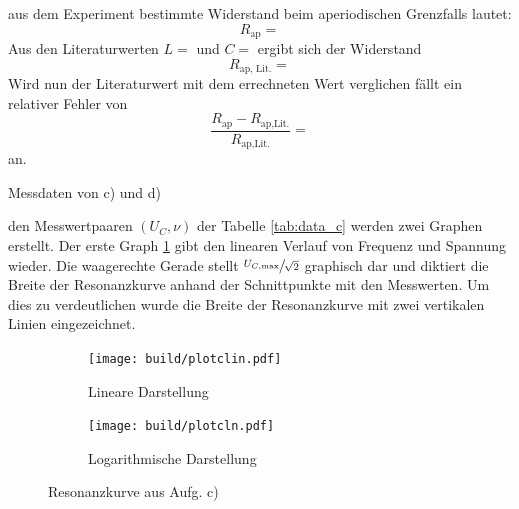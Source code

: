 
  \justifying aus dem Experiment bestimmte Widerstand beim aperiodischen Grenzfalls lautet:
  \begin{equation}
  R_{\text{ap}} = \text{} \label{eq:Rap}
  \end{equation}
  Aus den Literaturwerten $L = \text{}$ und $C =\text{}$ ergibt sich der Widerstand 
  \begin{equation}
  R_{\text{ap, Lit.}} = \text{} \label{eq:RapLit}
  \end{equation}
  Wird nun der Literaturwert mit dem errechneten Wert verglichen fällt ein relativer Fehler von
  \begin{equation}
  \frac{R_{\text{ap}} - R_{\text{ap,Lit.}}}{R_{\text{ap,Lit.}}} = \text{} \label{eq:RapAbw}
  \end{equation}
  an.


  \begin{table}[H]
        \centering
        \caption{Messdaten von c) und d)}
         
        \label{tab:data_c}
  \end{table}

  \justifying den Messwertpaaren $(U_C, \nu)$ der Tabelle \ref{tab:data_c} werden zwei Graphen erstellt. Der erste Graph \ref{fig:5clin} 
  gibt den linearen Verlauf von Frequenz und Spannung wieder. Die waagerechte Gerade stellt $\sfrac{U_{C,\text{max}}}{\sqrt{2}}$ graphisch dar und diktiert
  die Breite der Resonanzkurve anhand der Schnittpunkte mit den Messwerten. Um dies zu verdeutlichen wurde die Breite der Resonanzkurve mit zwei vertikalen 
  Linien eingezeichnet. 


  \begin{figure}[H]
    \begin{subfigure}{0.495\linewidth}
     \texttt{[image: build/plotclin.pdf]}
     \centering
     \caption{Lineare Darstellung}
     \label{fig:5clin}
    \end{subfigure}
    \begin{subfigure}{0.495\linewidth}
     \texttt{[image: build/plotcln.pdf]}
     \centering
     \caption{Logarithmische Darstellung}
     \label{fig:5cln}
    \end{subfigure}
    \caption{Resonanzkurve aus Aufg. c)}
  \end{figure} 

